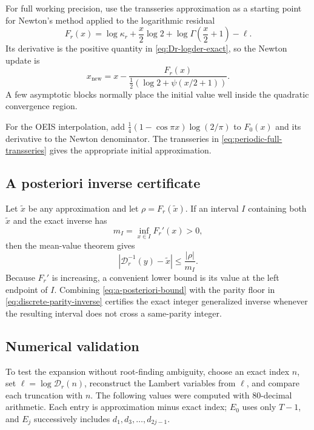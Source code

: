 \documentclass[11pt,a4paper,oneside]{article}
\theoremstyle{plain}
\theoremstyle{definition}
\theoremstyle{remark}
\newcommand{\D}{\mathcal D}
\begin{document}
For full working precision, use the transseries approximation as a starting
point for Newton's method applied to the logarithmic residual
\begin{equation}
 F_r(x)=\log\kappa_r+\frac{x}{2}\log2
 +\log\Gamma\!\left(\frac{x}{2}+1\right)-\ell.
 \label{eq:Newton-residual}
\end{equation}
Its derivative is the positive quantity in \cref{eq:Dr-logder-exact}, so the
Newton update is
\begin{equation}
 x_{\mathrm{new}}=x-
 \frac{F_r(x)}{\tfrac12\left(\log2+\psi(x/2+1)\right)}.
 \label{eq:Newton-update}
\end{equation}
A few asymptotic blocks normally place the initial value well inside the
quadratic convergence region.

For the OEIS interpolation, add
$\tfrac14(1-\cos\pi x)\log(2/\pi)$ to $F_0(x)$ and its derivative to the
Newton denominator.  The transseries in \cref{eq:periodic-full-transseries} gives the
appropriate initial approximation.

\subsection{A posteriori inverse certificate}

Let $\widetilde x$ be any approximation and let
$\rho=F_r(\widetilde x)$.  If an interval $I$ containing both
$\widetilde x$ and the exact inverse has
\begin{equation}
 m_I=\inf_{x\in I}F_r'(x)>0,
 \label{eq:slope-lower-bound}
\end{equation}
then the mean-value theorem gives
\begin{equation}
 |\D_r^{-1}(y)-\widetilde x|\le\frac{|\rho|}{m_I}.
 \label{eq:a-posteriori-bound}
\end{equation}
Because $F_r'$ is increasing, a convenient lower bound is its value at the left
endpoint of $I$.  Combining \cref{eq:a-posteriori-bound} with the parity floor
in \cref{eq:discrete-parity-inverse} certifies the exact integer generalized
inverse whenever the resulting interval does not cross a same-parity integer.

\subsection{Numerical validation}

To test the expansion without root-finding ambiguity, choose an exact index
$n$, set $\ell=\log\D_r(n)$, reconstruct the Lambert variables from $\ell$,
and compare each truncation with $n$.  The following values were computed with
80-decimal arithmetic.  Each entry is approximation minus exact index; $E_0$
uses only $T-1$, and $E_j$ successively includes $d_1,d_3,\ldots,d_{2j-1}$.
\end{document}
